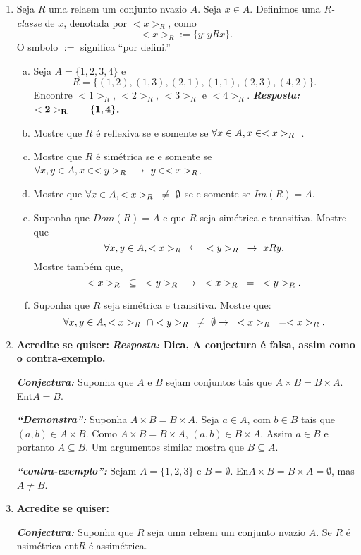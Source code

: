 \begin{enumerate}[{\bf 1.}]
\item Seja $R$ uma rela\cao em um conjunto n\ao vazio $A$. Seja $x\in A$. Definimos uma {\it R-classe} de $x$, denotada por $<x>_R$, como
\[
<x>_R:=\{y:yRx\}.
\]
O s\ih mbolo $:=$ significa ``por defini\caoi.''
\begin{enumerate}[a)]
\item Seja $A=\{1,2,3,4\}$ e
\[
R=\{(1,2), (1,3), (2,1), (1,1), (2,3), (4,2)\}.
\] 
Encontre $<1>_R$, $<2>_R$, $<3>_R$ e $<4>_R$. {\bf{\it Resposta:} ${\bf <2>_R\textrm{ }=\textrm{ } \{1,4\}}$.}
\item Mostre que $R$ \'e reflexiva se e somente se $\forall x\in A, x\in <x>_R\textrm{ }$. 
\item Mostre que $R$ \'e sim\'etrica se e somente se $\forall x,y\in A, x\in <y>_R\textrm{ }\to\textrm{ } y\in <x>_R$.
\item Mostre que $\forall x\in A, <x>_R\textrm{ }\neq\textrm{ }\emptyset$ se e somente se $Im(R)=A$.
\item Suponha que $Dom(R)=A$ e que $R$ seja sim\'etrica e transitiva. Mostre que
\[
\forall x,y\in A, <x>_R\textrm{ }\subseteq\textrm{ }<y>_R\textrm{ }\to\textrm{ } xRy.
\]
Mostre tamb\'em que,
\[
<x>_R\textrm{ }\subseteq\textrm{ }<y>_R\textrm{ }\to\textrm{ } <x>_R\textrm{ }=\textrm{ }<y>_R.
\]
\item Suponha que $R$ seja sim\'etrica e transitiva. Mostre que:
\[
\forall x,y\in A, <x>_R\textrm{ }\cap <y>_R\textrm{ }\neq\textrm{ }\emptyset\to\textrm{ } <x>_R\textrm{ }=<x>_R.
\]
\end{enumerate}

\item {\bf Acredite se quiser:}  {\bf{\it Resposta:} Dica, A conjectura \'e falsa, assim como o contra-exemplo.}

\noindent \textit{\textbf{Conjectura:}} Suponha que $A$ e $B$ sejam conjuntos tais que $A\times B=B\times A$. Ent\ao $A=B$.

\noindent \textit{\textbf{``Demonstra\caoi'':}} Suponha $A\times B=B\times A$. Seja $a\in A$, com $b\in B$ tais que $(a,b)\in A\times B$. Como $A\times B=B\times A$, $(a,b)\in B\times A$. Assim $a\in B$ e portanto $A\subseteq B$. Um argumentos similar mostra que $B\subseteq A$.

\noindent \textit{\textbf{``contra-exemplo'':}} Sejam $A=\{1,2,3\}$ e $B=\emptyset$. En\tao $A\times B=B\times A=\emptyset$, mas $A\neq B$. 

\item {\bf Acredite se quiser:}  

\noindent \textit{\textbf{Conjectura:}} Suponha que $R$ seja uma rela\cao em um conjunto n\ao vazio $A$. Se $R$ \'e n\ao sim\'etrica ent\ao $R$ \'e assim\'etrica. 


\end{enumerate}
